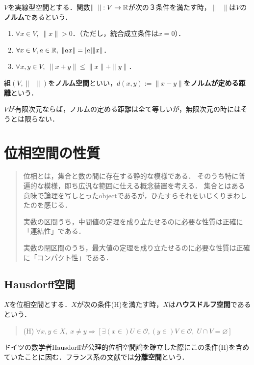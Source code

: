\documentclass[uplatex,dvipdfmx]{jsreport}
\begin{document}
\begin{definition}
    $V$を実線型空間とする．関数$\|\;\;\|:V\to\mathbb{R}$が次の３条件を満たす時，$\|\;\;\|$は$V$の\textbf{ノルム}であるという．
    \begin{enumerate}
        \item $\forall x\in V,\; \|x\|>0$．（ただし，統合成立条件は$x=0$）．
        \item $\forall x\in V,a\in\mathbb{R},\; \|ax\|=|a|\|x\|$．
        \item $\forall x,y\in V,\;\|x+y\|\le\|x\|+\|y\|$．
    \end{enumerate}
    組$(V,\|\;\;\|)$を\textbf{ノルム空間}といい，$d(x,y):=\|x-y\|$を\textbf{ノルムが定める距離}という．
\end{definition}
\begin{remark}
    $V$が有限次元ならば，ノルムの定める距離は全て等しいが，無限次元の時にはそうとは限らない．
\end{remark}

\chapter{位相空間の性質}

\begin{quotation}
    位相とは，集合と数の間に存在する静的な模様である．
    そのうち特に普遍的な模様，即ち広汎な範囲に仕える概念装置を考える．
    集合とはある意味で論理を写しとったobjectであるが，ひたすらそれをいじくりまわしたのを感じる．

    実数の区間うち，中間値の定理を成り立たせるのに必要な性質は正確に「連結性」である．

    実数の閉区間のうち，最大値の定理を成り立たせるのに必要な性質は正確に「コンパクト性」である．
\end{quotation}

\section{Hausdorff空間}

\begin{definition}[Hausdorff]
    $X$を位相空間とする．$X$が次の条件(H)を満たす時，$X$は\textbf{ハウスドルフ空間}であるという．
    \begin{quote}
        (H) $\forall x,y\in X,\; x\ne y\Rightarrow [\exists (x\in )U\in\mathcal{O}, (y\in)V\in\mathcal{O},\;U\cap V=\varnothing]$
    \end{quote}
\end{definition}
\begin{remark}
    ドイツの数学者Hausdorffが公理的位相空間論を確立した際にこの条件(H)を含めていたことに因む．フランス系の文献では\textbf{分離空間}という．
\end{remark}
\end{document}
